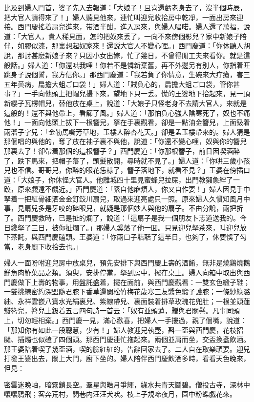 比及到婦人門首，婆子先入去報道：「大娘子！且喜還虧老身去了，沒半個時辰，把大官人請得來了！」婦人聽見他來，連忙叫迎兒收拾房中乾凈，一面出房來迎接。西門慶搖着扇兒進來，带酒半酣，進入房來，與婦人唱喏。婦人還了萬福，說道：「大官人，貴人稀見面，怎的把奴來丢了，一向不來傍個影兒？家中新娘子陪伴，如膠似漆，那裏想起奴家來！還説大官人不變心哩。」西門慶道：「你休聽人胡說，那討甚麽新娘子來？只因小女出嫁，忙了幾日，不曾得閒工夫來看你。就是這般話。」婦人道：「你還哄我哩！你若不是憐新棄舊，再不外邊另有别人，你指着旺跳身子說個誓，我方信你。」那西門慶道：「我若負了你情意，生碗來大疔瘡，害三五年黄病，扁擔大蛆ご口袋！」婦人道：「賊負心的，扁擔大蛆ご口袋，管你甚事？」一手向他頭上把帽兒撮下來，望地下只一丢。慌的王婆地下拾起來，見一頂新纓子瓦楞帽兒，替他放在桌上，說道：「大娘子只怪老身不去請大官人，來就是這般的！還不與他帶上，看篩了風。」婦人道：「那怕負心強人陰寒死了，奴也不痛他！」一面向他頭上拔下一根簪兒，拏在手裏觀看，卻是一點油金簪兒，上面鈒着兩溜子字兒：「金勒馬嘶芳草地，玉樓人醉杏花天。」卻是孟玉樓帶來的。婦人猜是那個唱的與他的，奪了放在袖子裏不與他，說道：「你還不變心哩，奴與你的簪兒那裏去了！卻帶着那個的這根簪子？」西門慶道：「你那根簪子，前日因喫酒醉了，跌下馬來，把帽子落了，頭髮散開，尋時就不見了。」婦人道：「你哄三歲小孩兒也不信。哥哥兒，你醉的眼花恁様了，簪子落地下，就看不見？」王婆在傍插口道：「大娘子，你休怪大官人。他離城四十里見蜜蜂兒拉屎，出門教獺象絆了一跤，原來覷遠不覷近。」西門慶道：「緊自他麻煩人，你又自作耍！」婦人因見手中拏着一把紅骨細洒金金釘鉸川扇兒，取過來迎亮處只一照。原來婦人久慣知風月中事，見扇兒多是牙咬的碎眼兒，就疑是那個妙人與他的扇子。不由分說，兩把折了。西門慶救時，已是扯的爛了，說道：「這扇子是我一個朋友卜志道送我的。今日纔拏了三日，被你扯爛了。」那婦人奚落了他一囬。只見迎兒拏茶來，叫迎兒放下茶託，與西門慶磕頭。王婆道：「你兩口子聐聒了這半日，也夠了，休要悞了勾當，老身廚下收拾去也。」

婦人一面吩咐迎兒房中放桌兒，預先安排下與西門慶上壽的酒餚，無非是燒鷄燒鵝鮮魚肉鮓菓品之類。須臾，安排停當，拏到房中，擺在桌上。婦人向箱中取出與西門慶做下上壽的物事，用盤託盛着，擺在面前，與西門慶觀看：一雙玄色緞子鞋；一雙挑線密約深盟隨君膝下香草邊闌松竹梅花歲寒三友醬色緞子護膝；一條紗綠潞紬、永祥雲嵌八寳水光絹裏兒、紫線帶兒、裏面裝着排草玫瑰花兜肚；一根並頭蓮瓣簪兒，簪兒上鈒着五言四句詩一首云：「奴有並頭蓮，贈與君關髻。凡事同頭上，切勿輕相棄。」西門慶一見，滿心歡喜，把婦人一手摟過，親了個嘴，說道：「那知你有如此一段聰慧，少有！」婦人教迎兒執壺，斟一盃與西門慶，花枝招颺、插燭也似磕了四個頭。那西門慶連忙拖起來。兩個並肩而坐，交盃換盞飲酒。那王婆陪着喫了幾盃酒，喫的臉紅紅的，告辭回家去了。二人自在取樂頑耍。迎兒打發王婆出去，關上大門，廚下坐的。婦人陪伴西門慶飲酒多時，看看天色晚來，但見：
\begin{myquote}
密雲迷晚岫，暗霧鎖長空。羣星與皓月爭輝，綠水共青天鬬碧。僧投古寺，深林中嚷嚷鴉飛；客奔荒村，閭巷内汪汪犬吠。枝上子規啼夜月，園中粉蝶戯花來。
\end{myquote}


